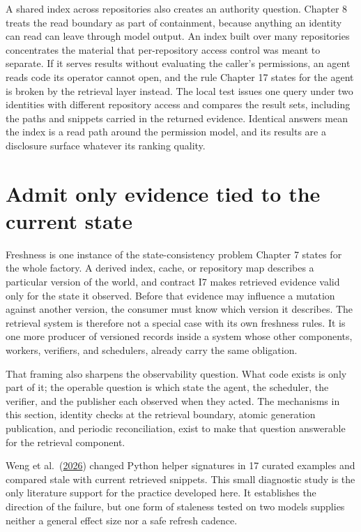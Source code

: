 A shared index across repositories also creates an authority question. Chapter 8 treats the read boundary as part of containment, because anything an identity can read can leave through model output. An index built over many repositories concentrates the material that per-repository access control was meant to separate. If it serves results without evaluating the caller's permissions, an agent reads code its operator cannot open, and the rule Chapter 17 states for the agent is broken by the retrieval layer instead. The local test issues one query under two identities with different repository access and compares the result sets, including the paths and snippets carried in the returned evidence. Identical answers mean the index is a read path around the permission model, and its results are a disclosure surface whatever its ranking quality.

\hypertarget{admit-only-evidence-tied-to-the-current-state}{%
\section{Admit only evidence tied to the current state}\label{admit-only-evidence-tied-to-the-current-state}}

Freshness is one instance of the state-consistency problem Chapter 7 states for the whole factory. A derived index, cache, or repository map describes a particular version of the world, and contract I7 makes retrieved evidence valid only for the state it observed. Before that evidence may influence a mutation against another version, the consumer must know which version it describes. The retrieval system is therefore not a special case with its own freshness rules. It is one more producer of versioned records inside a system whose other components, workers, verifiers, and schedulers, already carry the same obligation.

That framing also sharpens the observability question. What code exists is only part of it; the operable question is which state the agent, the scheduler, the verifier, and the publisher each observed when they acted. The mechanisms in this section, identity checks at the retrieval boundary, atomic generation publication, and periodic reconciliation, exist to make that question answerable for the retrieval component.

Weng et al.~(\href{https://arxiv.org/abs/2605.14478}{2026}) changed Python helper signatures in 17 curated examples and compared stale with current retrieved snippets. This small diagnostic study is the only literature support for the practice developed here. It establishes the direction of the failure, but one form of staleness tested on two models supplies neither a general effect size nor a safe refresh cadence.

